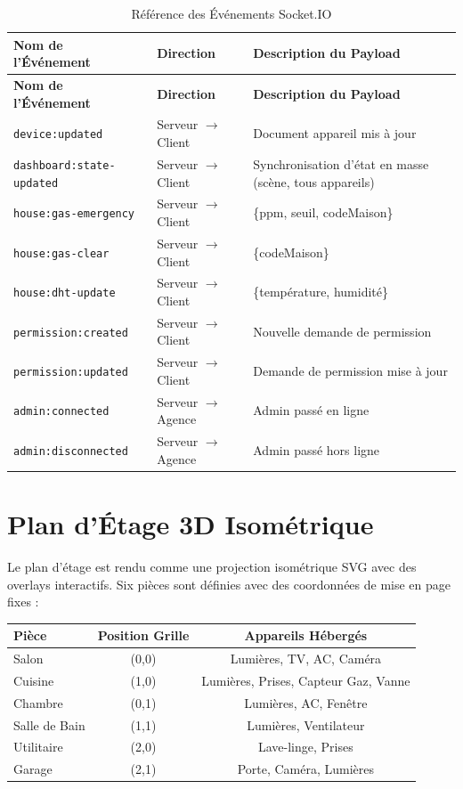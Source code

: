 \begin{center}
\begin{longtable}{p{} p{} p{}}
\caption{Référence des Événements Socket.IO}\label{tab:socket_events}\\
\toprule
\textbf{Nom de l'Événement} & \textbf{Direction} & \textbf{Description du Payload} \\
\midrule
\endfirsthead
\toprule
\textbf{Nom de l'Événement} & \textbf{Direction} & \textbf{Description du Payload} \\
\midrule
\endhead
\bottomrule
\endfoot
\texttt{device:updated}          & Serveur $\to$ Client & Document appareil mis à jour \\
\texttt{dashboard:state-updated} & Serveur $\to$ Client & Synchronisation d'état en masse (scène, tous appareils) \\
\texttt{house:gas-emergency}     & Serveur $\to$ Client & \{ppm, seuil, codeMaison\} \\
\texttt{house:gas-clear}         & Serveur $\to$ Client & \{codeMaison\} \\
\texttt{house:dht-update}        & Serveur $\to$ Client & \{température, humidité\} \\
\texttt{permission:created}      & Serveur $\to$ Client & Nouvelle demande de permission \\
\texttt{permission:updated}      & Serveur $\to$ Client & Demande de permission mise à jour \\
\texttt{admin:connected}         & Serveur $\to$ Agence & Admin passé en ligne \\
\texttt{admin:disconnected}      & Serveur $\to$ Agence & Admin passé hors ligne \\
\end{longtable}
\end{center}

\section{Plan d'Étage 3D Isométrique}

Le plan d'étage est rendu comme une projection isométrique SVG avec des overlays interactifs.
Six pièces sont définies avec des coordonnées de mise en page fixes :

\begin{center}
\begin{tabular}{lcc}
\toprule
\textbf{Pièce} & \textbf{Position Grille} & \textbf{Appareils Hébergés} \\
\midrule
Salon     & (0,0) & Lumières, TV, AC, Caméra \\
Cuisine   & (1,0) & Lumières, Prises, Capteur Gaz, Vanne \\
Chambre   & (0,1) & Lumières, AC, Fenêtre \\
Salle de Bain & (1,1) & Lumières, Ventilateur \\
Utilitaire   & (2,0) & Lave-linge, Prises \\
Garage    & (2,1) & Porte, Caméra, Lumières \\
\bottomrule
\end{tabular}
\end{center}

